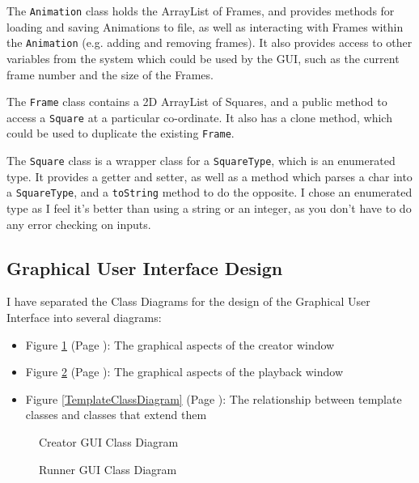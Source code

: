 \documentclass[a4paper, 11pt]{article}
\begin{document}
The \texttt{Animation} class holds the ArrayList of Frames, and provides methods for loading and saving Animations to file, as well as interacting with Frames within the \texttt{Animation} (e.g. adding and removing frames). It also provides access to other variables from the system which could be used by the GUI, such as the current frame number and the size of the Frames.

The \texttt{Frame} class contains a 2D ArrayList of Squares, and a public method to access a \texttt{Square} at a particular co-ordinate. It also has a clone method, which could be used to duplicate the existing \texttt{Frame}.

The \texttt{Square} class is a wrapper class for a \texttt{SquareType}, which is an enumerated type. It provides a getter and setter, as well as a method which parses a char into a \texttt{SquareType}, and a \texttt{toString} method to do the opposite. I chose an enumerated type as I feel it's better than using a string or an integer, as you don't have to do any error checking on inputs.

\subsection{Graphical User Interface Design}

I have separated the Class Diagrams for the design of the Graphical User Interface into several diagrams:
\begin{itemize}
\item Figure \ref{CreatorClassDiagram} (Page \pageref{CreatorClassDiagram}): The graphical aspects of the creator window
\item Figure \ref{RunnerClassDiagram} (Page \pageref{RunnerClassDiagram}): The graphical aspects of the playback window
\item Figure \ref{TemplateClassDiagram} (Page \pageref{TemplateClassDiagram}): The relationship between template classes and classes that extend them
\end{itemize}

\begin{figure}[H]
\centering
\caption{Creator GUI Class Diagram}
\label{CreatorClassDiagram}
\end{figure}

\begin{figure}[H]
\centering
\caption{Runner GUI Class Diagram}
\label{RunnerClassDiagram}
\end{figure}
\end{document}
